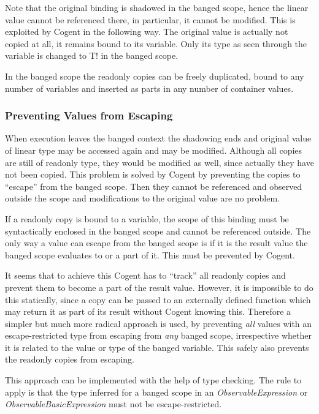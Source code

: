 \documentclass[a4paper]{report}
\newcommand{\cogent}{Cogent\xspace}
\begin{document}
Note that the original binding is shadowed in the banged scope, hence the linear value cannot be referenced there, 
in particular, it cannot be modified. This is exploited by \cogent in the following way. The original value is 
actually not copied at all, it remains bound to its variable. Only its type as seen through the variable is changed to T!
in the banged scope. 

In the banged scope the readonly copies can be freely duplicated, bound to any number of variables and inserted
as parts in any number of container values.

\subsubsection{Preventing Values from Escaping}

When execution leaves the banged context the shadowing ends and original value of linear type may be accessed again
and may be modified. Although all copies are still of readonly type, they would be modified as well, since actually
they have not been copied. This problem is solved by \cogent by preventing the copies to ``escape'' from the banged 
scope. Then they cannot be referenced and observed outside the scope and modifications to the original value
are no problem.

If a readonly copy is bound to a variable, the scope of this binding must be syntactically enclosed in the banged
scope and cannot be referenced outside. The only way a value can escape from the banged scope is if it is the result
value the banged scope evaluates to or a part of it. This must be prevented by \cogent.

It seems that to achieve this \cogent has to ``track'' all readonly copies and prevent them to become a part of 
the result value. However, it is impossible to do this statically, since a copy can be passed to an externally
defined function which may return it as part of its result without \cogent knowing this. Therefore a simpler
but much more radical approach is used, by preventing \textit{all} values with an escape-restricted type from
escaping from \textit{any} banged scope, irrespective whether it is related to the value or type of the 
banged variable. This safely also prevents the readonly copies from escaping. 

This approach can be implemented with the help of type checking. The rule to apply is that the type inferred 
for a banged scope in an \textit{ObservableExpression} or \textit{ObservableBasicExpression} must not be
escape-restricted.
\end{document}
